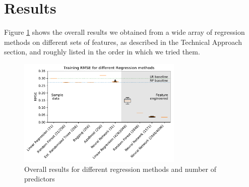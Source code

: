 \documentclass[11pt]{article}
\begin{document}
\section{Results}

Figure \ref{fig:results} shows the overall results we obtained from a wide array of regression methods on different sets of features, as described in the Technical Approach section, and roughly listed in the order in which we tried them.

\begin{figure}[h]
\centering
\includegraphics[width=0.7\textwidth]{Results_AC.pdf}
\caption{Overall results for different regression methods and number of predictors}
\label{fig:results}
\end{figure}


\end{document}
